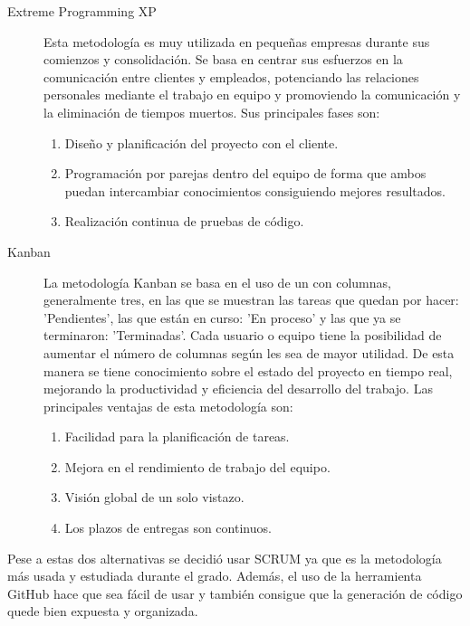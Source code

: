 \begin{description}
\item[Extreme Programming XP]
Esta metodología es muy utilizada en pequeñas empresas durante sus comienzos y consolidación. Se basa en centrar sus esfuerzos en la comunicación entre clientes y empleados, potenciando las relaciones personales mediante el trabajo en equipo y promoviendo la comunicación y la eliminación de tiempos muertos.
Sus principales fases son:
\begin{enumerate}
\item Diseño y planificación del proyecto con el cliente.
\item Programación por parejas dentro del equipo de forma que ambos puedan intercambiar conocimientos consiguiendo mejores resultados.
\item Realización continua de pruebas de código.
\end{enumerate}

\item[Kanban] 
La metodología Kanban se basa en el uso de un  con columnas, generalmente tres, en las que se muestran las tareas que quedan por hacer: 'Pendientes', las que están en curso: 'En proceso' y las que ya se terminaron: 'Terminadas'. Cada usuario o equipo tiene la posibilidad de aumentar el número de columnas según les sea de mayor utilidad. De esta manera se tiene conocimiento sobre el estado del proyecto en tiempo real, mejorando la productividad y eficiencia del desarrollo del trabajo.
Las principales ventajas de esta metodología son:
\begin{enumerate}
\item Facilidad para la planificación de tareas.
\item Mejora en el rendimiento de trabajo del equipo.
\item Visión global de un solo vistazo.
\item Los plazos de entregas son continuos.
\end{enumerate}
\end{description}

Pese a estas dos alternativas se decidió usar SCRUM ya que es la metodología más usada y estudiada durante el grado. Además, el uso de la herramienta GitHub hace que sea fácil de usar y también consigue que la generación de código quede bien expuesta y organizada.

